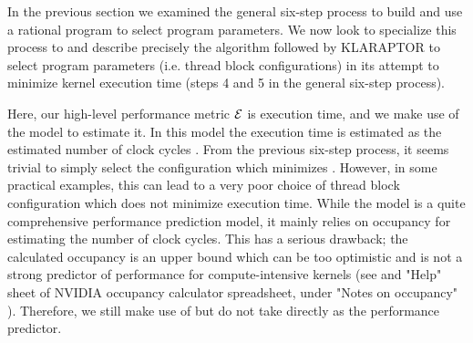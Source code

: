 \label{sec:heuristics}


In the previous section we examined the general six-step process
to build and use a rational program to select program parameters. 
We now look to specialize this process to {\cuda} 
and describe precisely the algorithm followed by KLARAPTOR
to select program parameters (i.e. thread block configurations)
in its attempt to minimize kernel execution time (steps 4 and 5 in the general six-step process).

Here, our high-level performance metric ${\cal E}$ is 
execution time, and we make use of the {\mwpcwp} model
\cite{DBLP:conf/isca/HongK09, DBLP:conf/ppopp/SimDKV12}
to estimate it.
In this model the execution time is estimated as the estimated 
number of clock cycles {\ec}.
From the previous six-step process, it seems
trivial to simply select the configuration which 
minimizes {\ec}.
However, in some practical examples, this can lead to a very poor choice
of thread block configuration which does not minimize execution time.
%
%
While the {\mwpcwp} model is a quite comprehensive performance prediction model, 
it mainly relies on occupancy for estimating the number of clock cycles. 
This has a serious drawback; the calculated occupancy is an upper
bound which can be too optimistic and is not a strong predictor of 
performance for compute-intensive kernels
(see \cite{Volkov:EECS-2016-143} and "Help" sheet of NVIDIA occupancy calculator spreadsheet, 
under "Notes on occupancy" \cite{nvidia:occupancy-calculator}).
Therefore, we still make use of {\mwpcwp} but do not 
take {\ec} directly as the performance predictor. 

